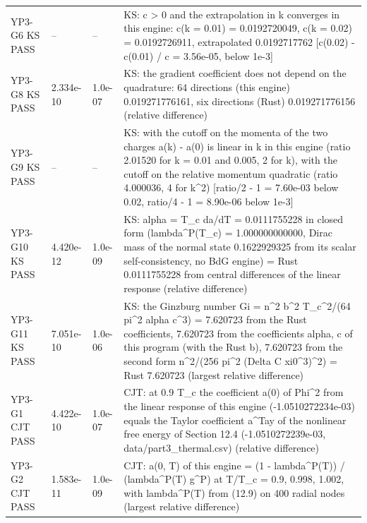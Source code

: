\documentclass[aps,prd,onecolumn,superscriptaddress,nofootinbib,floatfix,longbibliography]{revtex4-2}
\begin{document}
\begin{longtable}{p{}p{}p{}p{}}
YP3-G6 KS \newline PASS & -- & -- & KS: c \textgreater{} 0 and the extrapolation in k converges in this engine: c(k = 0.01) = 0.0192720049, c(k = 0.02) = 0.0192726911, extrapolated 0.0192717762 [\textbar{}c(0.02) - c(0.01)\textbar{} / c = 3.56e-05, below 1e-3] \\
YP3-G8 KS \newline PASS & 2.334e-10 & 1.0e-07 & KS: the gradient coefficient does not depend on the quadrature: 64 directions (this engine) 0.019271776161, six directions (Rust) 0.019271776156 (relative difference) \\
YP3-G9 KS \newline PASS & -- & -- & KS: with the cutoff on the momenta of the two charges a(k) - a(0) is linear in \textbar{}k\textbar{} in this engine (ratio 2.01520 for k = 0.01 and 0.005, 2 for \textbar{}k\textbar{}), with the cutoff on the relative momentum quadratic (ratio 4.000036, 4 for k\textasciicircum{}2) [\textbar{}ratio/2 - 1\textbar{} = 7.60e-03 below 0.02, \textbar{}ratio/4 - 1\textbar{} = 8.90e-06 below 1e-3] \\
YP3-G10 KS \newline PASS & 4.420e-12 & 1.0e-09 & KS: alpha = T\_c da/dT = 0.0111755228 in closed form (lambda\textasciicircum{}P(T\_c) = 1.000000000000, Dirac mass of the normal state 0.1622929325 from its scalar self-consistency, no BdG engine) = Rust 0.0111755228 from central differences of the linear response (relative difference) \\
YP3-G11 KS \newline PASS & 7.051e-10 & 1.0e-06 & KS: the Ginzburg number Gi = n\textasciicircum{}2 b\textasciicircum{}2 T\_c\textasciicircum{}2/(64 pi\textasciicircum{}2 alpha c\textasciicircum{}3) = 7.620723 from the Rust coefficients, 7.620723 from the coefficients alpha, c of this program (with the Rust b), 7.620723 from the second form n\textasciicircum{}2/(256 pi\textasciicircum{}2 (Delta C xi0\textasciicircum{}3)\textasciicircum{}2) = Rust 7.620723 (largest relative difference) \\
YP3-G1 CJT \newline PASS & 4.422e-10 & 1.0e-07 & CJT: at 0.9 T\_c the coefficient a(0) of \textbar{}Phi\textbar{}\textasciicircum{}2 from the linear response of this engine (-1.0510272234e-03) equals the Taylor coefficient a\textasciicircum{}Tay of the nonlinear free energy of Section 12.4 (-1.0510272239e-03, data/part3\_thermal.csv) (relative difference) \\
YP3-G2 CJT \newline PASS & 1.583e-11 & 1.0e-09 & CJT: a(0, T) of this engine = (1 - lambda\textasciicircum{}P(T)) / (lambda\textasciicircum{}P(T) g\textasciicircum{}P) at T/T\_c = 0.9, 0.998, 1.002, with lambda\textasciicircum{}P(T) from (12.9) on 400 radial nodes (largest relative difference) \\

\end{longtable}
\end{document}
